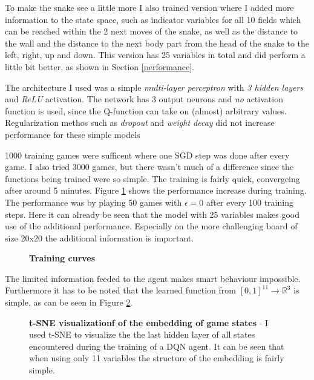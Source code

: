 \documentclass{article}
\begin{document}
To make the snake see a little more I also trained version where I added more information to the state space, such as indicator variables for all 10 fields which can be reached within the 2 next moves of the snake, as well as the distance to the wall and the distance to the next body part from the head of the snake to the left, right, up and down. This version has 25 variables in total and did perform a little bit better, as shown in Section \ref{performance}.

The architecture I used was a simple \emph{multi-layer perceptron} with \emph{3 hidden layers} and \emph{ReLU} activation. The network has 3 output neurons and \emph{no} activation function is used, since the Q-function can take on (almost) arbitrary values. Regularization methos such as \emph{dropout} and \emph{weight decay} did not increase performance for these simple models

1000 training games were sufficent where one SGD step was done after every game. I also tried 3000 games, but there wasn't much of a difference since the functions being trained were so simple. The training is fairly quick, convergeing after around 5 minutes. Figure \ref{training} shows the performance increase during training. The performance was by playing 50 games with $\epsilon=0$ after every 100 training steps. Here it can already be seen that the model with 25 variables makes good use of the additional performance. Especially on the more challenging board of size 20x20 the additional information is important.

\begin{figure}
	\centering
	\qquad
	\caption{\small \textbf{Training curves} }
	\label{training}
\end{figure} 

The limited information feeded to the agent makes smart behaviour impossible. Furthermore it has to be noted that the learned function from $[0,1]^{11} \rightarrow \mathbb{R}^3$ is simple, as can be seen in Figure  \ref{t-SNE}.

\begin{figure}
	\centering
	\qquad
	\caption{\small \textbf{t-SNE visualizationf of the embedding of game states} -  I used t-SNE to visualize the the last hidden layer of all states encountered during the training of a DQN agent.  It can be seen that when using only 11 variables the structure of the embedding is fairly simple.}
	\label{t-SNE}
\end{figure} 
\end{document}
